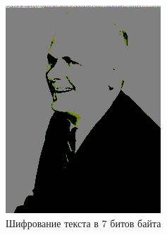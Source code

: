 \documentclass[10pt,a4paper,final]{article} %
\begin{document}
\begin{figure}[h!]
\begin{minipage}{0.3\textwidth}
		\includegraphics[width=\linewidth]{img/Haskell_7}
		\caption{Шифрование текста в 7 битов байта}
	\end{minipage}
	\hspace{0.02\textwidth}
	\begin{minipage}{0.3\textwidth}
		\centering

\end{minipage}
\end{figure}
\end{document}
